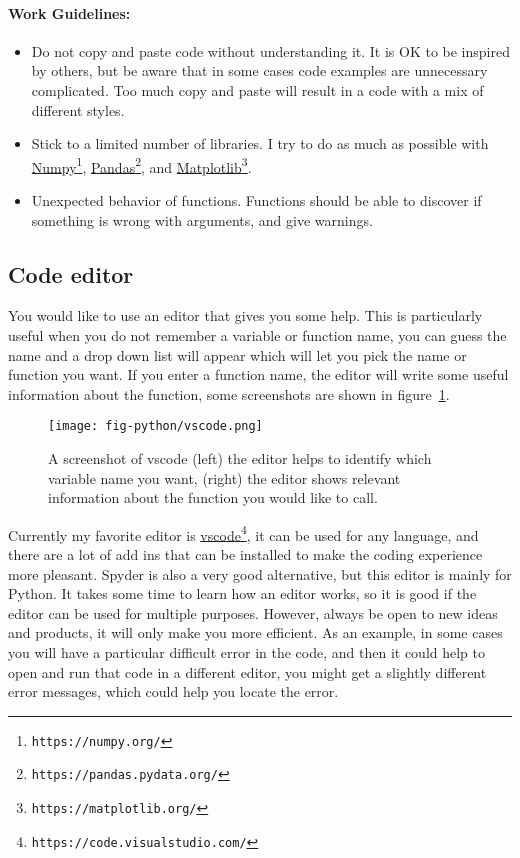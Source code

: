 \documentclass[graybox,sectrefs,envcountresetchap,open=right,final]{svmonodo}
\begin{document}
\noindent
\paragraph{Work Guidelines:}
\begin{itemize}
\item Do not copy and paste code without understanding it. It is OK to be inspired by others, but be aware that in some cases code examples are unnecessary complicated. Too much copy and paste will result in a code with a mix of different styles. 

\item Stick to a limited number of libraries. I try to do as much as possible with \href{{https://numpy.org/}}{Numpy}\footnote{\texttt{https://numpy.org/}}, \href{{https://pandas.pydata.org/}}{Pandas}\footnote{\texttt{https://pandas.pydata.org/}}, and  \href{{https://matplotlib.org/}}{Matplotlib}\footnote{\texttt{https://matplotlib.org/}}.

\item Unexpected behavior of functions. Functions should be able to discover if something is wrong with arguments, and give warnings.
\end{itemize}

\noindent
\subsection{Code editor}
You would like to use an editor that gives you some help. This is particularly useful when you do not remember a variable or function name, you can guess  the name and a drop down list will appear which will let you pick the name or function you want. If you enter  a function name, the editor will write some useful information about the function, some screenshots are shown in figure~\ref{fig:py:vscode}.

\begin{figure}[!ht]  %
  \centerline{\texttt{[image: fig-python/vscode.png]}}
  \caption{
  A screenshot of vscode (left) the editor helps to identify which variable name you want, (right) the editor shows relevant information about the function you would like to call. \label{fig:py:vscode}
  }
\end{figure}

Currently my favorite editor is \href{{https://code.visualstudio.com/}}{vscode}\footnote{\texttt{https://code.visualstudio.com/}}, it can be used for any language, and there are a lot of add ins that can be installed to make the coding experience more pleasant. Spyder is also a very good alternative, but this editor is mainly for Python. It takes some time to learn how an editor works, so it is good if the editor can be used for multiple purposes.  However, always be open to new ideas and products, it will only make you more efficient. As an example, in some cases you will have a particular difficult error in the code, and then it could help to open and run that code in a different editor, you might get a slightly different error messages, which could help you locate the error.
\end{document}
